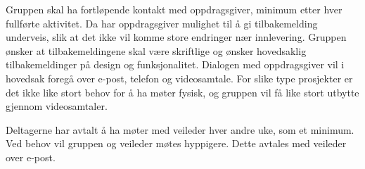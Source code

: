 Gruppen skal ha fortløpende kontakt med oppdragsgiver, minimum etter hver fullførte aktivitet. Da har oppdragsgiver mulighet til å gi tilbakemelding underveis, slik at det ikke vil komme store endringer nær innlevering. Gruppen ønsker at tilbakemeldingene skal være skriftlige og ønsker hovedsaklig tilbakemeldinger på design og funksjonalitet. Dialogen med oppdragsgiver vil i hovedsak foregå over e-post, telefon og videosamtale. For slike type prosjekter er det ikke like stort behov for å ha møter fysisk, og gruppen vil få like stort utbytte gjennom videosamtaler. 

Deltagerne har avtalt å ha møter med veileder hver andre uke, som et minimum. Ved behov vil gruppen og veileder møtes hyppigere. Dette avtales med veileder over e-post.






